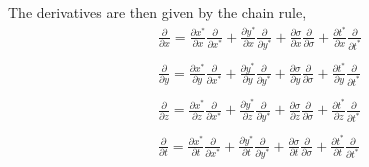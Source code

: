 \documentclass[oribibl]{llncs}
\begin{document}
The derivatives are then given by the chain rule,
\begin{eqnarray}
\frac{\partial}{\partial x} = \frac{\partial x^*}{\partial x} \frac{\partial}{\partial x^*} +  \frac{\partial y^*}{\partial x} \frac{\partial}{\partial y^*} +  \frac{\partial \sigma}{\partial x} \frac{\partial}{\partial \sigma} +  \frac{\partial t^*}{\partial x} \frac{\partial}{\partial t^*} \\ \nonumber \\ 
\frac{\partial}{\partial y} = \frac{\partial x^*}{\partial y} \frac{\partial}{\partial x^*} +  \frac{\partial y^*}{\partial y} \frac{\partial}{\partial y^*} +  \frac{\partial \sigma}{\partial y} \frac{\partial}{\partial \sigma} +  \frac{\partial t^*}{\partial y} \frac{\partial}{\partial t^*} \\ \nonumber \\ 
\frac{\partial}{\partial z} = \frac{\partial x^*}{\partial z} \frac{\partial}{\partial x^*} +  \frac{\partial y^*}{\partial z} \frac{\partial}{\partial y^*} +  \frac{\partial \sigma}{\partial z} \frac{\partial}{\partial \sigma} +  \frac{\partial t^*}{\partial z} \frac{\partial}{\partial t^*} \\ \nonumber \\ 
\frac{\partial}{\partial t} = \frac{\partial x^*}{\partial t} \frac{\partial}{\partial x^*} +  \frac{\partial y^*}{\partial t} \frac{\partial}{\partial y^*} +  \frac{\partial \sigma}{\partial t} \frac{\partial}{\partial \sigma} +  \frac{\partial t^*}{\partial t} \frac{\partial}{\partial t^*}
\end{eqnarray}
\end{document}
